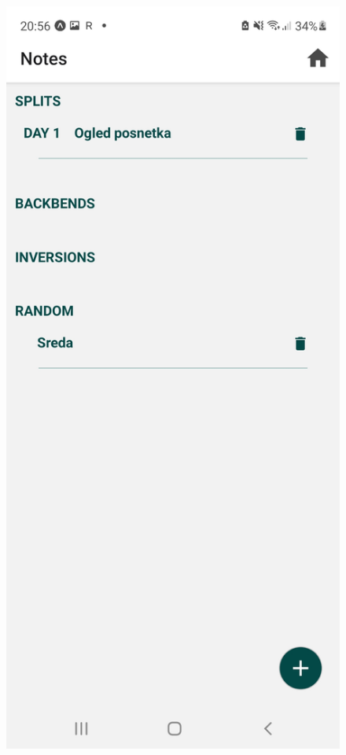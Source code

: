 \documentclass[a4paper, 12pt]{book}
\begin{document}
\begin{figure}[!htbp]
\centering
  \begin{minipage}[b]{0.41\textwidth}
    \includegraphics[width=\textwidth]{random.jpg}\centering

\end{minipage}
\end{figure}
\end{document}
